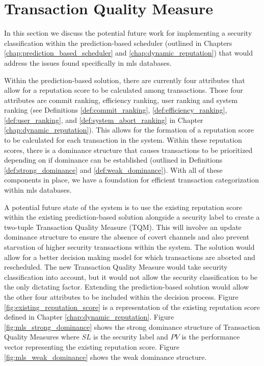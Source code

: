 \section{Transaction Quality Measure}
\label{mls:tqm}

In this section we discuss the potential future work for implementing a security classification within the prediction-based scheduler (outlined in Chapters \ref{chap:prediction_based_scheduler} and \ref{chap:dynamic_reputation}) that would address the issues found specifically in \gls{mls} databases. 

Within the prediction-based solution, there are currently four attributes that allow for a reputation score to be calculated among transactions. Those four attributes are commit ranking, efficiency ranking, user ranking and system ranking (see Definitions \ref{def:commit_ranking}, \ref{def:efficiency_ranking}, \ref{def:user_ranking}, and \ref{def:system_abort_ranking} in Chapter \ref{chap:dynamic_reputation}). This allows for the formation of a reputation score to be calculated for each transaction in the system. Within these reputation scores, there is a dominance structure that causes transactions to be prioritized depending on if dominance can be established (outlined in Definitions \ref{def:strong_dominance} and \ref{def:weak_dominance}). With all of these components in place, we have a foundation for efficient transaction categorization within \gls{mls} databases.

A potential future state of the system is to use the existing reputation score within the existing prediction-based solution alongside a security label to create a two-tuple Transaction Quality Measure (TQM). This will involve an update dominance structure to ensure the absence of covert channels and also prevent starvation of higher security transactions within the system. The solution would allow for a better decision making model for which transactions are aborted and rescheduled. The new Transaction Quality Measure would take security classification into account, but it would not allow the security classification to be the only dictating factor. Extending the prediction-based solution would allow the other four attributes to be included within the decision process. Figure \ref{fig:existing_reputation_score} is a representation of the existing reputation score defined in Chapter \ref{chap:dynamic_reputation}. Figure \ref{fig:mls_strong_dominance} shows the strong dominance structure of Transaction Quality Measures where $SL$ is the security label and $PV$ is the performance vector representing the existing reputation score. Figure \ref{fig:mls_weak_dominance} shows the weak dominance structure.

